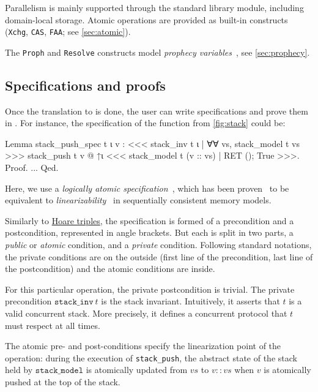 Parallelism is mainly supported through the  standard library module, including domain-local storage. Atomic operations are provided as built-in constructs (\texttt{Xchg}, \texttt{CAS}, \texttt{FAA}; see \cref{sec:atomic}).

The \texttt{Proph} and \texttt{Resolve} constructs model \emph{prophecy variables}~\cite{DBLP:journals/pacmpl/JungLPRTDJ20}, see \cref{sec:prophecy}.

\subsection{Specifications and proofs}
\label{subsec:stack-specs-and-proofs}

Once the translation to \ZooLang is done, the user can write specifications and prove them in \Iris.
For instance, the specification of the  function from \cref{fig:stack} could be:

\begin{coqcode}
Lemma stack_push_spec t ι v :
  <<< stack_inv t ι
    | ∀∀ vs, stack_model t vs >>>
    stack_push t v @ ↑ι
  <<< stack_model t (v :: vs)
    | RET (); True >>>.
Proof. ... Qed.
\end{coqcode}

Here, we use a \emph{logically atomic specification}~\cite{DBLP:conf/ecoop/PintoDG14}, which has been proven~\cite{DBLP:journals/pacmpl/BirkedalDGJST21} to be equivalent to \emph{linearizability}~\cite{DBLP:journals/toplas/HerlihyW90} in sequentially consistent memory models.

Similarly to \href{https://en.wikipedia.org/wiki/Hoare_logic}{Hoare triples},
the specification is formed of a precondition and a postcondition, represented in angle brackets.
But each is split in two parts, a \emph{public} or \emph{atomic} condition, and a \emph{private} condition.
Following standard \Iris notations, the private conditions are on the outside (first line of the precondition, last line of the postcondition) and the atomic conditions are inside.

For this particular operation, the private postcondition is trivial.
The private precondition $\mathtt{stack\_inv}\ t$ is the stack invariant.
Intuitively, it asserts that $t$ is a valid concurrent stack.
More precisely, it defines a concurrent protocol that $t$ must respect at all times.

The atomic pre- and post-conditions specify the linearization point of the operation: during the execution of \texttt{stack\_push}, the abstract state of the stack held by $\mathtt{stack\_model}$ is atomically updated from $\mathit{vs}$ to $\mathit{v} :: \mathit{vs}$ when $\mathit{v}$ is atomically pushed at the top of the stack.

